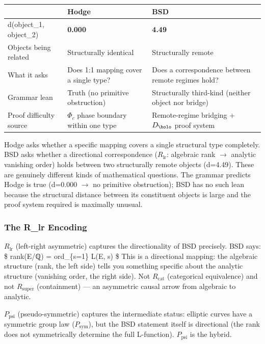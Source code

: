 \documentclass[12pt,a4paper]{article}
\begin{document}
\begin{table}[htbp]
\centering
\small
{}
\begin{tabularx}{\textwidth}{>{\centering\arraybackslash}X >{\centering\arraybackslash}X >{\centering\arraybackslash}X}
\toprule
\rowcolor{gray!25}\textbf{} & \textbf{Hodge} & \textbf{BSD} \\
\midrule
\rowcolors{1}{white}{gray!10}
d(object\_1, object\_2) & \textbf{0.000} & \textbf{4.49} \\
Objects being related & Structurally identical & Structurally remote \\
What it asks & Does 1:1 mapping cover a single type? & Does a correspondence between remote regimes hold? \\
Grammar lean & Truth (no primitive obstruction) & Structurally third-kind (neither object nor bridge) \\
Proof difficulty source & $\Phi_c$ phase boundary within one type & Remote-regime bridging + $D_{\holo}$ proof system \\
\bottomrule
\end{tabularx}
\end{table}

Hodge asks whether a specific mapping covers a single structural type completely. BSD asks whether a directional correspondence ($R_{\text{lr}}$: algebraic rank $\to$ analytic vanishing order) holds between two structurally remote objects (d=4.49). These are genuinely different kinds of mathematical questions. The grammar predicts Hodge is true (d=0.000 $\to$ no primitive obstruction); BSD has no such lean because the structural distance between its constituent objects is large and the proof system required is maximally unusual.

\subsubsection{The R\_lr Encoding}

$R_{\text{lr}}$ (left-right asymmetric) captures the directionality of BSD precisely. BSD says:
\$
rank(E/ℚ)  =  ord\_\{s=1\} L(E, s)
\$
This is a directional mapping: the algebraic structure (rank, the left side) tells you something specific about the analytic structure (vanishing order, the right side). Not $R_{\text{cat}}$ (categorical equivalence) and not $R_{\text{super}}$ (containment) --- an asymmetric causal arrow from algebraic to analytic.

$P_{\text{psi}}$ (pseudo-symmetric) captures the intermediate status: elliptic curves have a symmetric group law ($P_{\text{sym}}$), but the BSD statement itself is directional (the rank does not symmetrically determine the full L-function). $P_{\text{psi}}$ is the hybrid.
\end{document}
